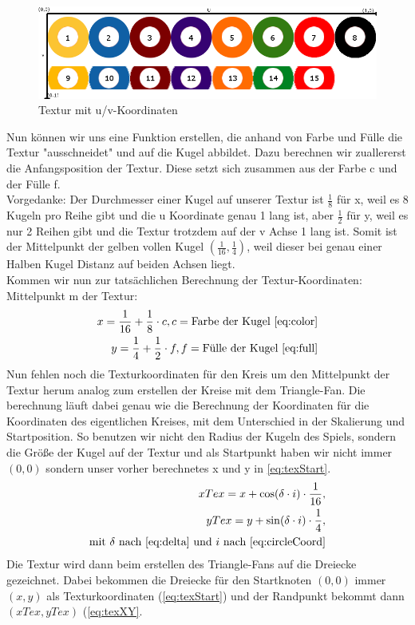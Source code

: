 	\begin{figure}[h]
		\caption{Textur mit u/v-Koordinaten}
		\includegraphics[width=\textwidth]{bilder/ballsachsen}
	\end{figure}
	Nun können wir uns eine Funktion erstellen, die anhand von Farbe und Fülle die Textur "ausschneidet" und auf die Kugel abbildet. Dazu berechnen wir zuallererst die Anfangsposition der Textur. Diese setzt sich zusammen aus der Farbe c und der Fülle f. \\
	Vorgedanke: Der Durchmesser einer Kugel auf unserer Textur ist $\frac{1}{8}$ für x, weil es 8 Kugeln pro Reihe gibt und die u Koordinate genau 1 lang ist, aber $\frac{1}{2}$ für y, weil es nur 2 Reihen gibt und die Textur trotzdem auf der v Achse 1 lang ist. Somit ist der Mittelpunkt der gelben vollen Kugel $(\frac{1}{16}, \frac{1}{4})$, weil dieser bei genau einer Halben Kugel Distanz auf beiden Achsen liegt. \\
	Kommen wir nun zur tatsächlichen Berechnung der Textur-Koordinaten: \\
	Mittelpunkt m der Textur: \\
	\begin{equation}\label{eq:texStart}
	\begin{aligned} 
		x = \frac{1}{16} + \frac{1}{8} \cdot c, c = \text{Farbe der Kugel \eqref{eq:color}} \\
		y = \frac{1}{4} + \frac{1}{2} \cdot f, f = \text{Fülle der Kugel \eqref{eq:full}}
	\end{aligned}
	\end{equation}
	Nun fehlen noch die Texturkoordinaten für den Kreis um den Mittelpunkt der Textur herum analog zum erstellen der Kreise mit dem Triangle-Fan. Die berechnung läuft dabei genau wie die Berechnung der Koordinaten für die Koordinaten des eigentlichen Kreises, mit dem Unterschied in der Skalierung und Startposition. So benutzen wir nicht den Radius der Kugeln des Spiels, sondern die Größe der Kugel auf der Textur und als Startpunkt haben wir nicht immer $(0,0)$ sondern unser vorher berechnetes x und y in \eqref{eq:texStart}. 
	\begin{equation}\label{eq:texXY}
	\begin{aligned}
		 xTex =  x + \cos(\delta \cdot i) \cdot \frac{1}{16}, \\
		 yTex =  y + \sin(\delta \cdot i) \cdot \frac{1}{4}, \\
		\text{mit } \delta \text{ nach }\eqref{eq:delta} \text{ und } i \text{ nach } \eqref{eq:circleCoord}
	\end{aligned}
	\end{equation}
	Die Textur wird dann beim erstellen des Triangle-Fans auf die Dreiecke gezeichnet. Dabei bekommen die Dreiecke für den Startknoten $(0,0)$ immer $(x,y)$ als Texturkoordinaten (\eqref{eq:texStart}) und der Randpunkt bekommt dann $(xTex,yTex)$ (\eqref{eq:texXY}.
